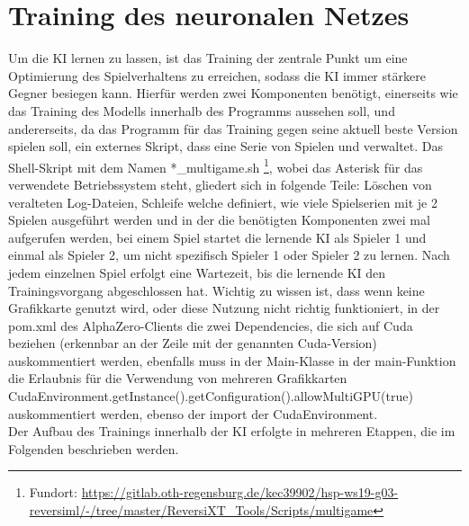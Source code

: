 \documentclass[12pt,a4paper]{article}
\begin{document}
\section{Training des neuronalen Netzes}
Um die KI lernen zu lassen, ist das Training der zentrale Punkt um eine Optimierung des Spielverhaltens zu erreichen, sodass die KI immer stärkere Gegner besiegen kann.  Hierfür werden zwei Komponenten benötigt, einerseits wie das Training des Modells innerhalb des Programms aussehen soll, und andererseits, da das Programm für das Training gegen seine aktuell beste Version spielen soll, ein externes Skript, dass eine Serie von Spielen und verwaltet. Das Shell-Skript mit dem Namen *\_multigame.sh \footnote{Fundort: \url{https://gitlab.oth-regensburg.de/kec39902/hsp-ws19-g03-reversiml/-/tree/master/ReversiXT_Tools/Scripts/multigame}}, wobei das Asterisk für das verwendete Betriebssystem steht, gliedert sich in folgende Teile: Löschen von veralteten Log-Dateien, Schleife welche definiert, wie viele Spielserien mit je 2 Spielen ausgeführt werden und in der die benötigten Komponenten zwei mal aufgerufen werden, bei einem Spiel startet die lernende KI als Spieler 1 und einmal als Spieler 2, um nicht spezifisch Spieler 1 oder Spieler 2 zu lernen. Nach jedem einzelnen Spiel erfolgt eine Wartezeit, bis die lernende KI den Trainingsvorgang abgeschlossen hat. Wichtig zu wissen ist, dass wenn keine Grafikkarte genutzt wird, oder diese Nutzung nicht richtig funktioniert, in der pom.xml des AlphaZero-Clients die zwei Dependencies, die sich auf Cuda beziehen (erkennbar an der Zeile mit der genannten Cuda-Version) auskommentiert werden, ebenfalls muss in der Main-Klasse in der main-Funktion die Erlaubnis für die Verwendung von mehreren Grafikkarten \glqq CudaEnvironment.getInstance().getConfiguration().allowMultiGPU(true)\grqq{} auskommentiert werden, ebenso der import der CudaEnvironment. \\
Der Aufbau des Trainings innerhalb der KI erfolgte in mehreren Etappen, die im Folgenden beschrieben werden. \\
\end{document}
